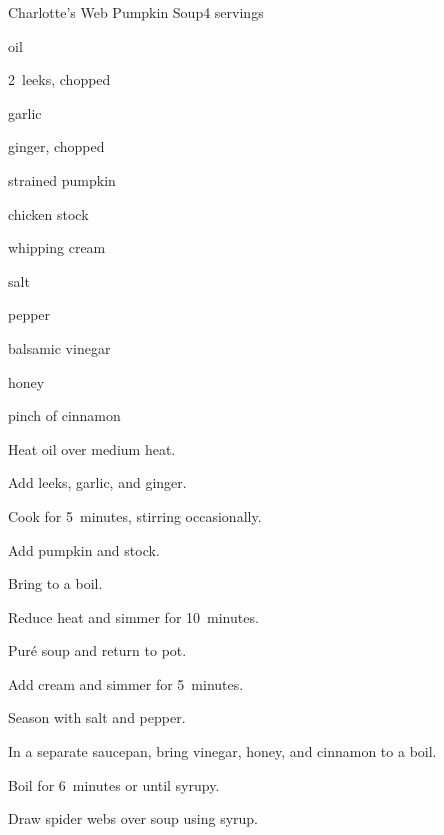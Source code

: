 \begin{recipe}{Charlotte's Web Pumpkin Soup}{}{4 servings}

\begin{ingredients}
\item {} oil
\item 2~leeks, chopped
\item {} garlic
\item {} ginger, chopped
\item {} strained pumpkin
\item {} chicken stock
\item \C{\quarter} whipping cream
\item salt
\item pepper
\item \C{\half} balsamic vinegar
\item {} honey
\item pinch of cinnamon
\end{ingredients}

\begin{directions}
\item Heat oil over medium heat.
\item Add leeks, garlic, and ginger.
\item Cook for 5~minutes, stirring occasionally.
\item Add pumpkin and stock.
\item Bring to a boil.
\item Reduce heat and simmer for 10~minutes.
\item Pur\'e soup and return to pot.
\item Add cream and simmer for 5~minutes.
\item Season with salt and pepper.
\item In a separate saucepan, bring vinegar, honey, and cinnamon to a boil.
\item Boil for 6~minutes or until syrupy.
\item Draw spider webs over soup using syrup.
\end{directions}

\end{recipe}
